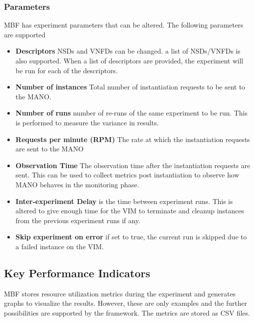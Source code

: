 \subsubsection{Parameters}

MBF has experiment parameters that can be altered. 
The following parameters are supported

\begin{itemize}
	\item{\textbf{Descriptors}} NSDs and VNFDs can be changed. 
	a list of NSDs/VNFDs is also supported. 
	When a list of descriptors are provided, the experiment will be run for each of the descriptors.
	\item{\textbf{Number of instances}} Total number of instantiation requests to be sent to the MANO.
	\item{\textbf{Number of runs}} number of re-runs of the same experiment to be run. 
	This is performed to measure the variance in results.
	\item{\textbf{Requests per minute (RPM)}} The rate at which the instantiation requests are sent to the MANO
	\item{\textbf{Observation Time}} The observation time after the instantiation requests are sent. 
	This can be used to collect metrics post instantiation to observe how MANO behaves in the monitoring phase.
	\item{\textbf{Inter-experiment Delay}} is the time between experiment runs. 
	This is altered to give enough time for the VIM to terminate and cleanup instances from the previous experiment runs if any.
	\item{\textbf{Skip experiment on error}} if set to true, the current run is skipped due to a failed instance on the VIM.

\end{itemize}

\subsection{Key Performance Indicators}

MBF stores resource utilization metrics during the experiment and generates graphs to visualize the results. 
However, these are only examples and the further possibilities are supported by the framework. 
The metrics are stored as CSV files.

